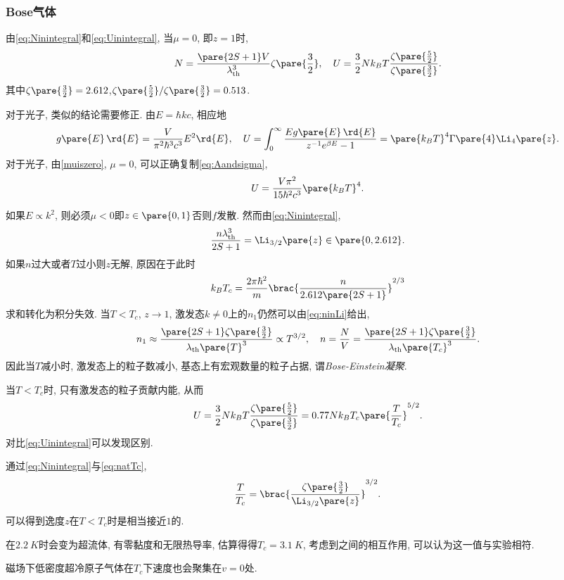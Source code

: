 \documentclass[../Thermal.tex]{subfiles}
\begin{document}
\subsubsection{Bose气体}
由\eqref{eq:Ninintegral}和\eqref{eq:Uinintegral}, 当$\mu = 0$, 即$z=1$时,
\[ N = \frac{\pare{2S+1}V}{\lambda_{\mathrm{th}}^3}\zeta\pare{\frac{3}{2}},\quad U=\frac{3}{2}Nk_BT\frac{\zeta\pare{\frac{5}{2}}}{\zeta\pare{\frac{3}{2}}}. \]
其中$\zeta\pare{\frac{3}{2}} = 2.612$,$\zeta\pare{\frac{5}{2}}/\zeta\pare{\frac{3}{2}}=0.513$.
\begin{ex}
对于光子, 类似的结论需要修正. 由$E = \hbar kc$, 相应地
\[ g\pare{E}\,\rd{E} = \frac{V}{\pi^2\hbar^3c^3}E^2\rd{E},\quad U = \int_0^\infty \frac{Eg\pare{E}\,\rd{E}}{z^{-1}e^{\beta E}-1} = \pare{k_BT}^4\Gamma\pare{4}\Li_4\pare{z}. \]
对于光子, 由\cref{muiszero}, $\mu = 0$, 可以正确复制\eqref{eq:Aandsigma},
\[ U = \frac{V\pi^2}{15\hbar^2c^3}\pare{k_BT}^4. \]
\end{ex}
如果$E\propto k^2$, 则必须$\mu<0$即$z\in\pare{0,1}$否则$f$发散. 然而由\eqref{eq:Ninintegral},
\begin{equation}
\label{eq:ninLi}
\frac{n\lambda_{\mathrm{th}}^3}{2S+1} = \Li_{3/2}\pare{z}\in\pare{0,2.612}.
\end{equation}
如果$n$过大或者$T$过小则$z$无解, 原因在于此时
\[ k_B T_c = \frac{2\pi\hbar^2}{m}\brac{\frac{n}{2.612\pare{2S+1}}}^{2/3} \]
求和转化为积分失效. 当$T<T_c$, $z\rightarrow 1$, 激发态$k\neq 0$上的$n_1$仍然可以由\eqref{eq:ninLi}给出,
\begin{equation}
\label{eq:natTc}
n_1 \approx \frac{\pare{2S+1}\zeta\pare{\frac{3}{2}}}{\lambda_{\mathrm{th}}\pare{T}^3}\propto T^{3/2},\quad n = \frac{N}{V} = \frac{\pare{2S+1}\zeta\pare{\frac{3}{2}}}{\lambda_{\mathrm{th}}\pare{T_c}^3}.
\end{equation}
因此当$T$减小时, 激发态上的粒子数减小, 基态上有宏观数量的粒子占据, 谓\emph{Bose-Einstein凝聚}.
\begin{ex}
当$T<T_c$时, 只有激发态的粒子贡献内能, 从而
\[ U = \frac{3}{2}Nk_BT\frac{\zeta\pare{\frac{5}{2}}}{\zeta\pare{\frac{3}{2}}} = 0.77Nk_BT_c\pare{\frac{T}{T_c}}^{5/2}. \]
对比\eqref{eq:Uinintegral}可以发现区别.
\end{ex}
通过\eqref{eq:Ninintegral}与\eqref{eq:natTc},
\[ \frac{T}{T_c} = \brac{\frac{\zeta\pare{\frac{3}{2}}}{\Li_{3/2}\pare{z}}}^{3/2}. \]
可以得到逸度$z$在$T<T_c$时是相当接近$1$的.
\begin{ex}
在$\SI{2.2}{K}$时会变为超流体, 有零黏度和无限热导率, 估算得得$T_c=\SI{3.1}{K}$, 考虑到之间的相互作用, 可以认为这一值与实验相符.
\end{ex}
\begin{ex}
磁场下低密度超冷原子气体在$T_c$下速度也会聚集在$v=0$处.
\end{ex}
\end{document}
